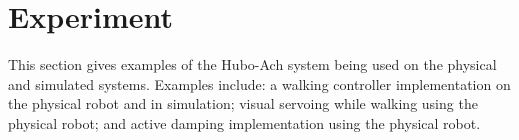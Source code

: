 \chapter{Experiment}\label{sec:experiment2}






This section gives examples of the Hubo-Ach system being used on the physical and simulated systems.  Examples include: a walking controller implementation on the physical robot and in simulation; visual servoing while walking using the physical robot; and active damping implementation using the physical robot.






